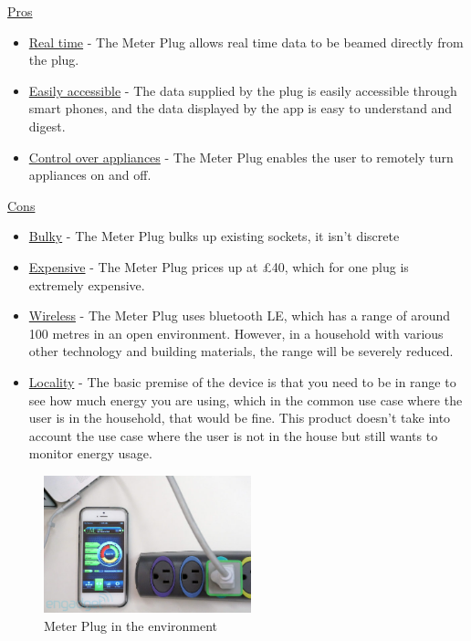 \documentclass[preprint,12pt,3p]{elsarticle}
\begin{document}
\begin{center}
    \underline{Pros}
    \begin{itemize}
      \item \underline{Real time} - The Meter Plug allows real time data to be beamed directly from the plug. 
      \item \underline{Easily accessible} - The data supplied by the plug is easily accessible through smart phones, and the data displayed by the app is easy to understand and digest.
      \item \underline{Control over appliances} - The Meter Plug enables the user to remotely turn appliances on and off.
    \end{itemize}
    
    \underline{Cons}
    
    \begin{itemize}
      \item \underline{Bulky} - The Meter Plug bulks up existing sockets, it isn't discrete
      \item \underline{Expensive} - The Meter Plug prices up at \pounds40, which for one plug is extremely expensive. 
      \item \underline{Wireless} - The Meter Plug uses bluetooth LE, which has a range of around 100 metres in an open environment. However, in a household with various other technology and building materials, the range will be severely reduced.
      \item \underline{Locality} - The basic premise of the device is that you need to be in range to see how much energy you are using, which in the common use case where the user is in the household, that would be fine. This product doesn't take into account the use case where the user is not in the house but still wants to monitor energy usage.
    \end{itemize}
    
\end{center}


\begin{figure}[h]
    \centering
    \includegraphics[width=6cm]{existing/meterplug}
    \caption {Meter Plug in the environment}
\end{figure}
\end{document}

